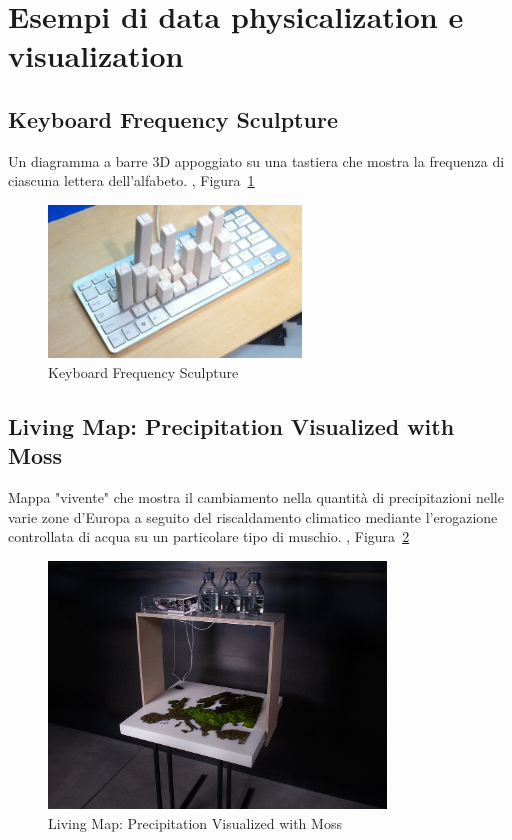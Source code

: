 \documentclass[12pt,a4paper]{report}
\begin{document}
\section{Esempi di data physicalization e visualization}

\subsection{Keyboard Frequency Sculpture}
Un diagramma a barre 3D appoggiato su una tastiera che mostra la frequenza di ciascuna lettera dell'alfabeto. \cite{physlist}, Figura~\ref{fig:keyboardfreq}
\begin{figure}[h]
  \centering
  \includegraphics[width=0.6\textwidth]{keyboardfreq}
  \caption{Keyboard Frequency Sculpture}
  \label{fig:keyboardfreq}
\end{figure}

\subsection{Living Map: Precipitation Visualized with Moss}
Mappa "vivente" che mostra il cambiamento nella quantità di precipitazioni nelle varie zone d'Europa a seguito del riscaldamento climatico
mediante l'erogazione controllata di acqua su un particolare tipo di muschio.  \cite{physlist}, Figura~\ref{fig:livingmap}
\begin{figure}[h]
  \centering
  \includegraphics[width=0.8\textwidth]{livingmap}
  \caption{Living Map: Precipitation Visualized with Moss}
  \label{fig:livingmap}
\end{figure}
\end{document}
